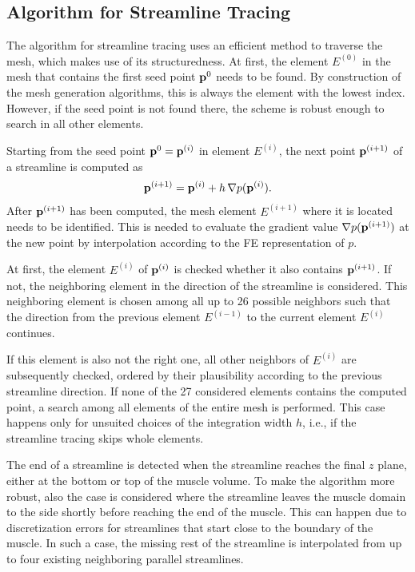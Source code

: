 \subsection{Algorithm for Streamline Tracing}\label{sec:algorithm_for_streamline_tracing}
The algorithm for streamline tracing uses an efficient method to traverse the mesh, which makes use of its structuredness.
At first, the element $E^{(0)}$ in the mesh that contains the first seed point $\textbf{p}^0$ needs to be found. By construction of the mesh generation algorithms, this is always the element with the lowest index. 
However, if the seed point is not found there, the scheme is robust enough to search in all other elements.

Starting from the seed point $\textbf{p}^0 = \textbf{p}^{(i)}$ in element $E^{(i)}$, the next point $\textbf{p}^{(i+1)}$ of a streamline is computed as %
\begin{align*}
  \textbf{p}^{(i+1)} = \textbf{p}^{(i)} + h\,\nabla p (\textbf{p}^{(i)}).
\end{align*}
After $\textbf{p}^{(i+1)}$ has been computed, the mesh element $E^{(i+1)}$ where it is located needs to be identified. This is needed to evaluate the gradient value $\nabla p (\textbf{p}^{(i+1)})$ at the new point by interpolation according to the FE representation of $p$.

At first, the element $E^{(i)}$ of $\textbf{p}^{(i)}$ is checked whether it also contains $\textbf{p}^{(i+1)}$. If not, the neighboring element in the direction of the streamline is considered. This neighboring element is chosen among all up to 26 possible neighbors such that the direction from the previous element $E^{(i-1)}$ to the current element $E^{(i)}$ continues.

If this element is also not the right one, all other neighbors of $E^{(i)}$ are subsequently checked, ordered by their plausibility according to the previous streamline direction. If none of the 27 considered elements contains the computed point, a search among all elements of the entire mesh is performed. This case happens only for unsuited choices of the integration width $h$, i.e., if the streamline tracing skips whole elements.

The end of a streamline is detected when the streamline reaches the final $z$ plane, either at the bottom or top of the muscle volume. To make the algorithm more robust, also the case is considered where the streamline leaves the muscle domain to the side shortly before reaching the end of the muscle. This can happen due to discretization errors for streamlines that start close to the boundary of the muscle. In such a case, the missing rest of the streamline is interpolated from up to four existing neighboring parallel streamlines.

